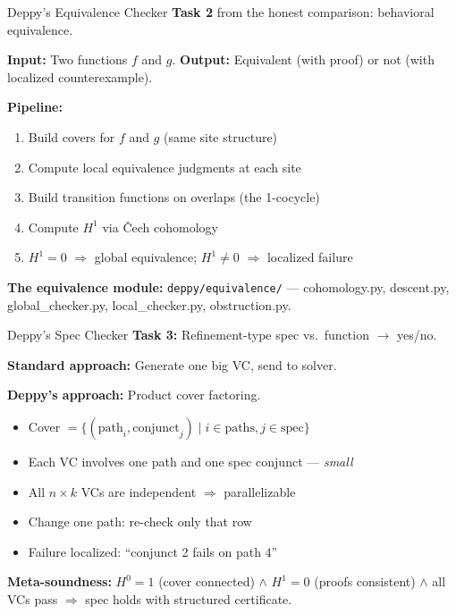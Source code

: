 \documentclass[aspectratio=169,10pt]{beamer}
\begin{document}
\begin{frame}{Deppy's Equivalence Checker}
\textbf{Task 2} from the honest comparison: behavioral equivalence.

\textbf{Input:} Two functions $f$ and $g$.
\textbf{Output:} Equivalent (with proof) or not (with localized counterexample).

\vspace{0.3em}
\textbf{Pipeline:}
\begin{enumerate}
  \item Build covers for $f$ and $g$ (same site structure)
  \item Compute local equivalence judgments at each site
  \item Build transition functions on overlaps (the 1-cocycle)
  \item Compute $H^1$ via \v{C}ech cohomology
  \item $H^1 = 0$ $\Rightarrow$ global equivalence; $H^1 \neq 0$ $\Rightarrow$ localized failure
\end{enumerate}

\vspace{0.3em}
\textbf{The equivalence module:} \texttt{deppy/equivalence/} --- cohomology.py, descent.py, global\_checker.py, local\_checker.py, obstruction.py.
\end{frame}

\begin{frame}{Deppy's Spec Checker}
\textbf{Task 3:} Refinement-type spec vs.\ function $\to$ yes/no.

\textbf{Standard approach:} Generate one big VC, send to solver.

\textbf{Deppy's approach:} Product cover factoring.
\begin{itemize}
  \item Cover $= \{(\text{path}_i, \text{conjunct}_j) \mid i \in \text{paths}, j \in \text{spec}\}$
  \item Each VC involves one path and one spec conjunct --- \emph{small}
  \item All $n \times k$ VCs are independent $\Rightarrow$ parallelizable
  \item Change one path: re-check only that row
  \item Failure localized: ``conjunct 2 fails on path 4''
\end{itemize}

\vspace{0.3em}
\textbf{Meta-soundness:} $H^0 = 1$ (cover connected) $\wedge$ $H^1 = 0$ (proofs consistent) $\wedge$ all VCs pass $\Rightarrow$ spec holds with structured certificate.
\end{frame}
\end{document}
